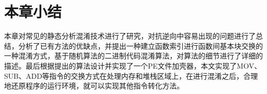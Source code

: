 \section{本章小结}

本章对常见的静态分析混淆技术进行了研究，对抗逆向中容易出现的问题进行了总结，分析了已有方法的优缺点，并提出一种建立函数索引进行函数间基本块交换的一种混淆方式，基于随机算法的二进制代码混淆算法，对算法的细节进行了详细的描述。最后根据提出的算法设计并实现了一个PE文件加壳器，本文实现了MOV、SUB、ADD等指令的交换方式在处理内存和堆栈区域上，在进行混淆之后，合理地还原程序的运行环境，就可以实现其他指令转化方法。









